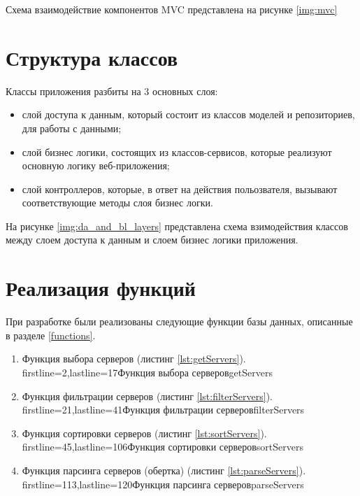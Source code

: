 Схема взаимодействие компонентов MVC представлена на рисунке \ref{img:mvc}


\section{Структура классов}

Классы приложения разбиты на 3 основных слоя:

\begin{itemize}
    \item слой доступа к данным, который состоит из классов моделей и репозиториев, для работы с данными;
    \item слой бизнес логики, состоящих из классов-сервисов, которые реализуют основную логику веб-приложения;
    \item слой контроллеров, которые, в ответ на действия польозвателя, вызывают соответствующие методы слоя бизнес логки.
\end{itemize}

На рисунке \ref{img:da_and_bl_layers} представлена схема взимодействия классов между слоем доступа к данным и слоем бизнес логики приложения. 

\newpage

\section{Реализация функций}

При разработке были реализованы следующие функции базы данных, описанные в разделе \ref{functions}.

\begin{enumerate}
    \item Функция выбора серверов (листинг \ref{lst:getServers}).
            {firstline=2,lastline=17}{Функция выбора серверов}{getServers}{}

    \item Функция фильтрации серверов (листинг \ref{lst:filterServers}).
            {firstline=21,lastline=41}{Функция фильтрации серверов}{filterServers}{}

    \item Функция сортировки серверов (листинг \ref{lst:sortServers}).
            {firstline=45,lastline=106}{Функция сортировки серверов}{sortServers}{}

    \item Функция парсинга серверов (обертка) (листинг \ref{lst:parseServers}).
            {firstline=113,lastline=120}{Функция парсинга серверов}{parseServers}{}
\end{enumerate}


